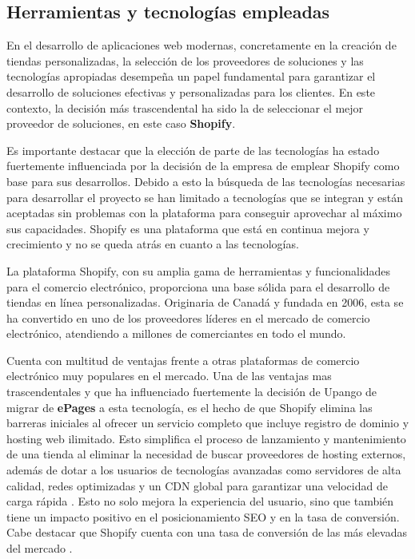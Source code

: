 \documentclass[12pt]{article}
\begin{document}
\subsection{Herramientas y tecnologías empleadas}
En el desarrollo de aplicaciones web modernas, concretamente en la creación de tiendas personalizadas, la selección de los proveedores de soluciones
y las tecnologías apropiadas desempeña un papel fundamental para garantizar el desarrollo de soluciones efectivas y personalizadas para los clientes.
En este contexto, la decisión más trascendental ha sido la de seleccionar el mejor proveedor de soluciones, en este caso \textbf{Shopify}.

Es importante destacar que la elección de parte de las tecnologías ha estado fuertemente influenciada por la decisión de la empresa de emplear Shopify
como base para sus desarrollos. Debido a esto la búsqueda de las tecnologías necesarias para desarrollar el proyecto se han limitado a
tecnologías que se integran y están aceptadas sin problemas con la plataforma para conseguir aprovechar al máximo sus capacidades. Shopify es una plataforma que está en continua mejora y crecimiento y no se queda atrás en cuanto a las tecnologías.

La plataforma Shopify, con su amplia gama de herramientas y funcionalidades para el comercio electrónico, 
proporciona una base sólida para el desarrollo de tiendas en línea personalizadas. Originaria de Canadá y 
fundada en 2006, esta se ha convertido en uno de los proveedores líderes en el mercado de comercio electrónico, 
atendiendo a millones de comerciantes en todo el mundo. 

Cuenta con multitud de ventajas frente a otras plataformas de comercio electrónico muy populares en el mercado. Una de las ventajas
mas trascendentales y que ha influenciado fuertemente  la decisión de Upango de migrar de \textbf{ePages} a esta tecnología, es el hecho de que Shopify elimina
las barreras iniciales al ofrecer un servicio completo que incluye registro de dominio y hosting web ilimitado. Esto simplifica el proceso de lanzamiento y mantenimiento
de una tienda al eliminar la necesidad de buscar proveedores de hosting externos, además de dotar a los usuarios de tecnologías avanzadas como servidores de alta
calidad, redes optimizadas y un CDN global para garantizar una velocidad de carga rápida \cite{shopify-tutorial}. Esto no solo mejora la experiencia del usuario, sino que también 
tiene un impacto positivo en el posicionamiento SEO y en la tasa de conversión. Cabe destacar que Shopify cuenta con una tasa de conversión de las más
elevadas del mercado \cite{shopify-tasa-conversion}. 
\end{document}
